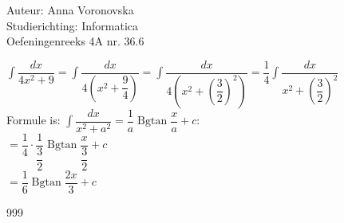 \documentclass[a4paper]{article}
\begin{document}
  
\noindent \large Auteur: Anna Voronovska \\
\noindent \large Studierichting: Informatica\\
\noindent \large Oefeningenreeks 4A nr. 36.6\\

\medskip

\normalsize

$\displaystyle\int \dfrac{dx}{4x^2+9} = \displaystyle\int \dfrac{dx}{4\left(x^2 + \dfrac{9}{4}\right)} = \displaystyle\int \dfrac{dx}{4\left(x^2 + \left(\dfrac{3}{2}\right)^2\right)} = \dfrac{1}{4}\displaystyle\int \dfrac{dx}{x^2 + \left(\dfrac{3}{2}\right)^2}$\\

Formule is:  $\displaystyle\int \dfrac{dx}{x^2+a^2} = \dfrac{1}{a}\operatorname{Bgtan}\dfrac{x}{a} + c$:\\

$= \dfrac{1}{4} \cdot \dfrac{1}{\dfrac{3}{2}} \operatorname{Bgtan}\dfrac{x}{\dfrac{3}{2}} + c$\\

$= \dfrac{1}{6}\operatorname{Bgtan}\dfrac{2x}{3} + c$\\

\begin{thebibliography}{999}
\end{thebibliography}
\end{document}
